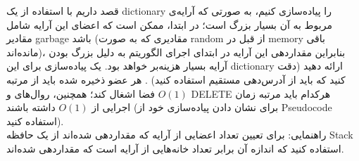 قصد داریم با استفاده از  یک dictionary
را پیاده‌سازی کنیم، به صورتی که آرایه‌ی مربوط به آن بسیار بزرگ
است؛ در ابتدا، ممکن است که اعضای این آرایه شامل مقادیر
garbage باشد (مقادیری که به صورت random از قبل در memory باقی مانده‌اند)،
بنابراین مقداردهی این آرایه در ابتدای اجرای الگوریتم
به دلیل بزرگ بودن آرایه بسیار هزینه‌بر خواهد بود.
یک پیاده‌سازی برای این dictionary ارائه دهید (دقت کنید که باید از آدرس‌دهی مستقیم استفاده کنید)
. هر عضو ذخیره شده باید از مرتبه $O(1)$ فضا اشغال کند؛
همچنین، روال‌های  و DELETE هرکدام باید 
مرتبه زمان اجرایی از $O(1)$ داشته باشند (برای نشان دادن پیاده‌سازی خود از Pseudocode استفاده کنید).
\\ راهنمایی: برای تعیین تعداد اعضایی از آرایه که مقداردهی شده‌اند از یک
حافظه Stack استفاده کنید که اندازه آن برابر تعداد خانه‌هایی از 
آرایه است که مقداردهی شده‌اند.

